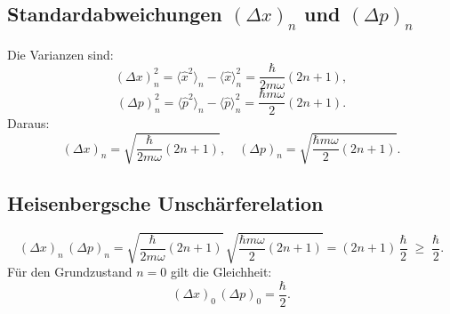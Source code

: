 \documentclass{article}
\begin{document}
\subsection*{Standardabweichungen $(\Delta x)_n$ und $(\Delta p)_n$}
Die Varianzen sind:
\[
  (\Delta x)_n^2 
  = \langle \hat x^2 \rangle_n - \langle \hat x \rangle_n^2
  = \frac{\hbar}{2m\omega}(2n+1),
\]
\[
  (\Delta p)_n^2
  = \langle \hat p^2 \rangle_n - \langle \hat p \rangle_n^2
  = \frac{\hbar m\omega}{2}(2n+1).
\]
Daraus:
\[
  (\Delta x)_n = \sqrt{\frac{\hbar}{2m\omega}(2n+1)},
  \quad
  (\Delta p)_n = \sqrt{\frac{\hbar m\omega}{2}(2n+1)}.
\]

\subsection*{Heisenbergsche Unschärferelation}
\[
  (\Delta x)_n\,(\Delta p)_n
  = \sqrt{\frac{\hbar}{2m\omega}(2n+1)}
    \,\sqrt{\frac{\hbar m\omega}{2}(2n+1)}
  = (2n+1)\,\frac{\hbar}{2}
  \;\ge\;\frac{\hbar}{2}.
\]
Für den Grundzustand $n=0$ gilt die Gleichheit:
\[
  (\Delta x)_0\,(\Delta p)_0 = \frac{\hbar}{2}.
\]
\end{document}
